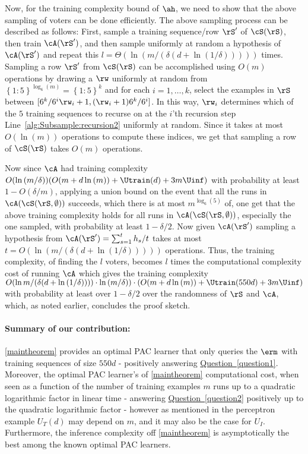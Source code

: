 Now, for the training complexity bound of $ \ah $, we need to show that the above sampling of voters can be done efficiently. The above sampling process can be described as follows: First, sample a training sequence/row $\rS' $  of $ \cS(\rS) $, then train $ \cA(\rS') $, and then sample uniformly at random a hypothesis of $ \cA(\rS') $ and repeat this $l=\Theta(\ln{\left(m/(\delta(d+\ln{\left(1/\delta \right)})) \right)})$ times. Sampling a row $ \rS' $  from $ \cS(\rS) $ can be accomplished using $ O(m) $ operations by 
drawing a $ \rw$ uniformly at random from $\left\{ 1:5 \right\}^{\log_{6}(m)}=\left\{ 1:5 \right\}^{k}$ and for each  $i=1,\ldots,k$, select the examples in $ \rS $ between $ [ 6^{k}/6^{i}\rw_i+1,(\rw_i+1)6^{k}/6^{i}] $. In this way, $ \rw_{i} $ determines which of the $ 5 $ training sequences to recurse on at the $ i $'th recursion step Line~\ref{alg:Subsample:recursion2} uniformly at random. Since it takes at most $ O(\ln{\left(m \right)}) $ operations to compute these indices,
we get that sampling a row of $ \cS(\rS) $ takes $ O(m) $ operations. 

Now since $ \cA $ had training complexity $ O(\ln{\left(m/\delta \right)} )(O(m+d\ln{\left(m \right)})+\Utrain(d)+3m\Uinf ) $ with probability at least $ 1-O(\delta/m) $, applying a union bound on the event that all the runs in $\cA(\cS(\rS,\emptyset))$ succeeds, which there is at most $ m^{\log_{6}(5)} $ of, one get that the above training complexity holds for all runs in $ \cA(\cS(\rS,\emptyset)) $, especially the one sampled,  with probability at least $ 1-\delta/2 $. Now given $ \cA(\rS') $  sampling a hypothesis from $ \cA(\rS')= \sum_{s=1}^{t} h_s/t $ takes at most $t= O(\ln{\left(m/(\delta(d+\ln{\left(1/\delta \right)})) \right)}) $ operations. Thus, the training complexity, of finding the $ l $ voters, becomes $ l $ times the computational complexity cost of running $ \cA$ which gives the training complexity      $O(\ln{m/(\delta(d+\ln{\left(1/\delta \right)}))} )\cdot\ln{(m/\delta )})\cdot (O(m+d\ln{\left(m \right)})+\Utrain(550d)+ 3m\Uinf)$
with probability at least over $ 1-\delta/2 $  over the randomness of $ \rS$ and $\cA$, which, as noted earlier, concludes the proof sketch.

\paragraph{Summary of our contribution:} \cref{maintheorem} provides an optimal PAC learner that only queries the $ \erm $  with training sequences of size $ 550d $ - positively answering \hyperref[question1]{Question~\ref*{question1}}. Moreover, the optimal PAC learner's of \cref{maintheorem} computational cost, when seen as a function of the number of training examples $ m $ runs up to a quadratic logarithmic factor in linear time - answering \hyperref[question2]{Question~\ref*{question2}} positively up to the quadratic logarithmic factor - however as mentioned in the perceptron example $ U_{T}(d) $ may depend on $ m $, and it may also be the case for $ U_{I} $. Furthermore, the inference complexity off \cref{maintheorem} is asymptotically the best among the known optimal PAC learners. 

